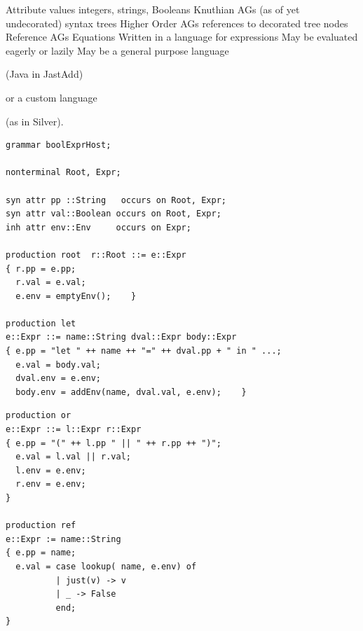 \documentclass[notes,11pt,aspectratio=169]{beamer}
\begin{document}
\begin{frame}
Attribute values
\biA
 \x integers, strings, Booleans \hfill Knuthian AGs
 \x (as of yet undecorated) syntax trees \hfill Higher Order AGs
 \x references to decorated tree nodes \hfill Reference AGs
\ei
Equations
\biA
 \x Written in a language for expressions
 \x May be evaluated eagerly or lazily
 \x May be a general purpose language
   
    (Java in JastAdd)

    or a custom language

    (as in Silver).
\ei
\end{frame}


\begin{frame}[fragile]
\small
\begin{verbatim}
grammar boolExprHost;

nonterminal Root, Expr;

syn attr pp ::String   occurs on Root, Expr; 
syn attr val::Boolean occurs on Root, Expr; 
inh attr env::Env     occurs on Expr; 

production root  r::Root ::= e::Expr
{ r.pp = e.pp;
  r.val = e.val;
  e.env = emptyEnv();    }

production let
e::Expr ::= name::String dval::Expr body::Expr
{ e.pp = "let " ++ name ++ "=" ++ dval.pp + " in " ...;
  e.val = body.val;
  dval.env = e.env;
  body.env = addEnv(name, dval.val, e.env);    }
\end{verbatim}
\end{frame}


\begin{frame}[fragile]
\small
\begin{verbatim}
production or
e::Expr ::= l::Expr r::Expr
{ e.pp = "(" ++ l.pp " || " ++ r.pp ++ ")";
  e.val = l.val || r.val;
  l.env = e.env;  
  r.env = e.env;
}

production ref
e::Expr := name::String
{ e.pp = name;
  e.val = case lookup( name, e.env) of 
          | just(v) -> v
          | _ -> False
          end;
}
\end{verbatim}
\end{frame}

\newcommand{\ys}{1.3}

\newcommand{\enve}[2]{\draw[blue] ($(#1-0.4,\ys*#2-0.35)$) circle(0.15);}
\newcommand{\envd}[2]{\filldraw[blue] ($(#1-0.4,\ys*#2-0.35)$) circle(0.05);}
\newcommand{\envc}[2]{\filldraw[blue] ($(#1-0.4,\ys*#2-0.35)$) circle(0.15);}

\newcommand{\ppe}[2]{\draw[dgreen] ($(#1+0.4,\ys*#2-0.35)$) circle(0.15);}
\newcommand{\ppd}[2]{\filldraw[dgreen] ($(#1+0.4,\ys*#2-0.35)$) circle(0.05);}
\newcommand{\ppc}[2]{\filldraw[dgreen] ($(#1+0.4,\ys*#2-0.35)$) circle(0.15);}
\end{document}
